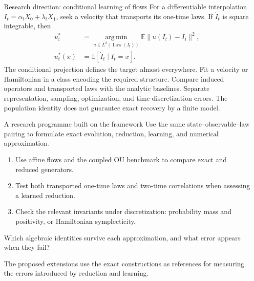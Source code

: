 \begin{frame}[t]{Research direction: conditional learning of flows}
\hypertarget{main:research-learning}{}
For a differentiable interpolation $I_t=\alpha_tX_0+\lambda_tX_1$, seek a velocity
that transports its one-time laws.
If $\dot I_t$ is square integrable, then
\begin{equation*}
  \begin{aligned}
    u_t^*&=\operatorname*{arg\,min}_{u\in L^2(\operatorname{Law}(I_t))}
      \mathbb E\|u(I_t)-\dot I_t\|^2,\\
    u_t^*(x)&=\mathbb E[\dot I_t\mid I_t=x].
  \end{aligned}
\end{equation*}
The conditional projection defines the target almost everywhere.
Fit a velocity or Hamiltonian in a class encoding the required structure.
Compare induced operators and transported laws with the analytic baselines.
Separate representation, sampling, optimization, and time-discretization errors.
The population identity does not guarantee exact recovery by a finite model.
\end{frame}

\begin{frame}[t]{A research programme built on the framework}
\hypertarget{main:research-programme}{}
Use the same state--observable--law pairing to formulate exact evolution,
reduction, learning, and numerical approximation.
\begin{enumerate}\setlength{\itemsep}{8pt}
  \item Use affine flows and the coupled OU benchmark to compare exact and reduced generators.
  \item Test both transported one-time laws and two-time correlations when assessing a learned reduction.
  \item Check the relevant invariants under discretization: probability mass and positivity, or Hamiltonian symplecticity.
\end{enumerate}
Which algebraic identities survive each approximation, and what error appears when they fail?
\par\medskip
The proposed extensions use the exact constructions as references for measuring
the errors introduced by reduction and learning.
\end{frame}
